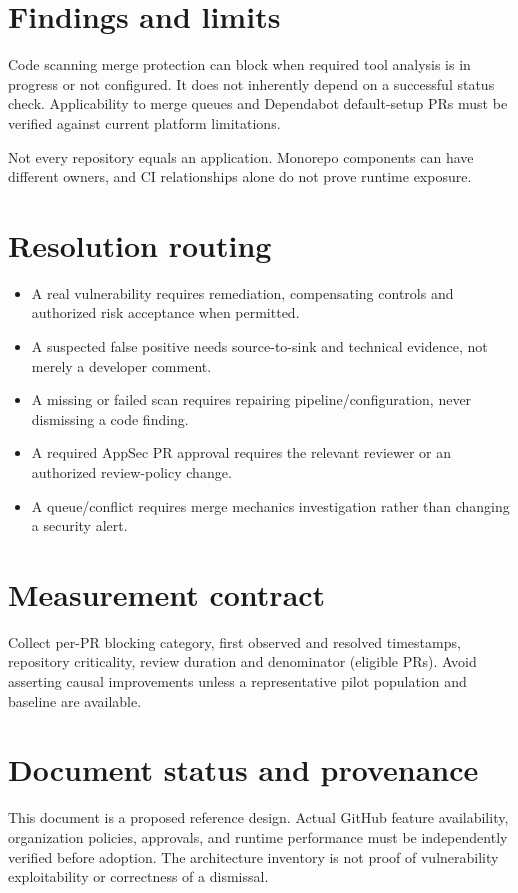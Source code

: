 \documentclass[11pt,letterpaper]{article}
\begin{document}
\section{Findings and limits}
Code scanning merge protection can block when required tool analysis is in progress or not configured. It does not inherently depend on a successful status check. Applicability to merge queues and Dependabot default-setup PRs must be verified against current platform limitations.

Not every repository equals an application. Monorepo components can have different owners, and CI relationships alone do not prove runtime exposure.


\section{Resolution routing}
\begin{itemize}
\item A real vulnerability requires remediation, compensating controls and authorized risk acceptance when permitted.
\item A suspected false positive needs source-to-sink and technical evidence, not merely a developer comment.
\item A missing or failed scan requires repairing pipeline/configuration, never dismissing a code finding.
\item A required AppSec PR approval requires the relevant reviewer or an authorized review-policy change.
\item A queue/conflict requires merge mechanics investigation rather than changing a security alert.
\end{itemize}

\section{Measurement contract}
Collect per-PR blocking category, first observed and resolved timestamps, repository criticality, review duration and denominator (eligible PRs). Avoid asserting causal improvements unless a representative pilot population and baseline are available.


\section*{Document status and provenance}
This document is a proposed reference design. Actual GitHub feature availability, organization policies, approvals, and runtime performance must be independently verified before adoption. The architecture inventory is not proof of vulnerability exploitability or correctness of a dismissal.
\end{document}
